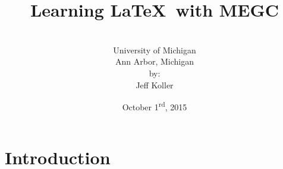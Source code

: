 \documentclass[]{article}%
\theoremstyle{definition}
\begin{document}
	
	
	
	\title{Learning \LaTeX\ with MEGC}
	\author{\vspace{1 in} \\University of Michigan 
		\\Ann Arbor, Michigan \vspace{.25 in} \\by: \\Jeff Koller \vspace{1 in}
	} 
	\date{October 1\textsuperscript{rd}, 2015}
	\maketitle				%
	\thispagestyle{empty} 	%
	\clearpage				%
	
	
	
	\section{Introduction}
	
\end{document}
